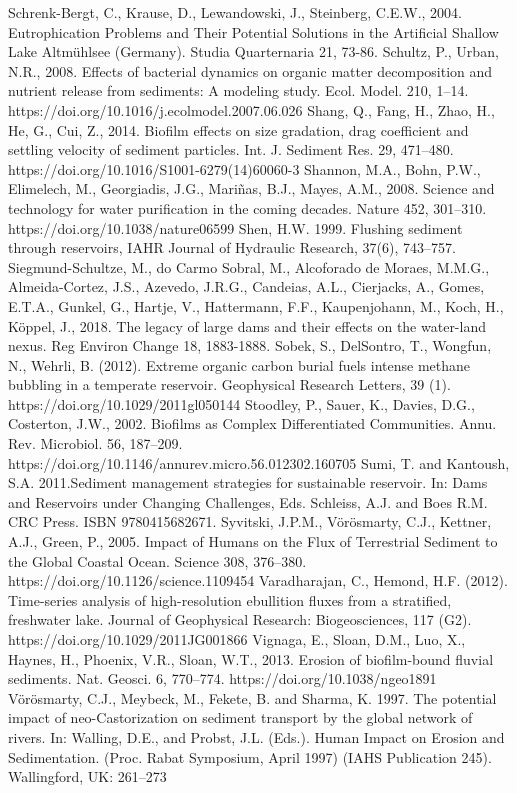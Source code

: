 \begin{thebibliography}{}
Schrenk-Bergt, C., Krause, D., Lewandowski, J., Steinberg, C.E.W., 2004. Eutrophication Problems and Their Potential Solutions in the Artificial Shallow Lake Altmühlsee (Germany). Studia Quarternaria 21, 73-86.
Schultz, P., Urban, N.R., 2008. Effects of bacterial dynamics on organic matter decomposition and nutrient release from sediments: A modeling study. Ecol. Model. 210, 1–14. https://doi.org/10.1016/j.ecolmodel.2007.06.026
Shang, Q., Fang, H., Zhao, H., He, G., Cui, Z., 2014. Biofilm effects on size gradation, drag coefficient and settling velocity of sediment particles. Int. J. Sediment Res. 29, 471–480. https://doi.org/10.1016/S1001-6279(14)60060-3
Shannon, M.A., Bohn, P.W., Elimelech, M., Georgiadis, J.G., Mariñas, B.J., Mayes, A.M., 2008. Science and technology for water purification in the coming decades. Nature 452, 301–310. https://doi.org/10.1038/nature06599
Shen, H.W. 1999. Flushing sediment through reservoirs, IAHR Journal of Hydraulic Research, 37(6), 743–757.
Siegmund-Schultze, M., do Carmo Sobral, M., Alcoforado de Moraes, M.M.G., Almeida-Cortez, J.S., Azevedo, J.R.G., Candeias, A.L., Cierjacks, A., Gomes, E.T.A., Gunkel, G., Hartje, V., Hattermann, F.F., Kaupenjohann, M., Koch, H., Köppel, J., 2018. The legacy of large dams and their effects on the water-land nexus. Reg Environ Change 18, 1883-1888.
Sobek, S., DelSontro, T., Wongfun, N., Wehrli, B. (2012). Extreme organic carbon burial fuels intense methane bubbling in a temperate reservoir. Geophysical Research Letters, 39 (1). https://doi.org/10.1029/2011gl050144
Stoodley, P., Sauer, K., Davies, D.G., Costerton, J.W., 2002. Biofilms as Complex Differentiated Communities. Annu. Rev. Microbiol. 56, 187–209. https://doi.org/10.1146/annurev.micro.56.012302.160705
Sumi, T. and Kantoush, S.A. 2011.Sediment management strategies for sustainable reservoir. In: Dams and Reservoirs under Changing Challenges, Eds. Schleiss, A.J. and Boes R.M. CRC Press. ISBN 9780415682671.
Syvitski, J.P.M., Vörösmarty, C.J., Kettner, A.J., Green, P., 2005. Impact of Humans on the Flux of Terrestrial Sediment to the Global Coastal Ocean. Science 308, 376–380. https://doi.org/10.1126/science.1109454
Varadharajan, C., Hemond, H.F. (2012). Time-series analysis of high-resolution ebullition fluxes from a stratified, freshwater lake. Journal of Geophysical Research: Biogeosciences, 117 (G2). https://doi.org/10.1029/2011JG001866
Vignaga, E., Sloan, D.M., Luo, X., Haynes, H., Phoenix, V.R., Sloan, W.T., 2013. Erosion of biofilm-bound fluvial sediments. Nat. Geosci. 6, 770–774. https://doi.org/10.1038/ngeo1891
Vörösmarty, C.J., Meybeck, M., Fekete, B. and Sharma, K. 1997. The potential impact of neo-Castorization on sediment transport by the global network of rivers. In: Walling, D.E., and Probst, J.L. (Eds.). Human Impact on Erosion and Sedimentation. (Proc. Rabat Symposium, April 1997) (IAHS Publication 245). Wallingford, UK: 261–273

\end{thebibliography}
